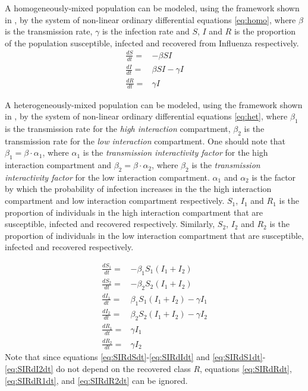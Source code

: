 \documentclass[a4paper, 12pt, journal]{ieeeconf}\usepackage[]{graphicx}\usepackage[]{color}
\begin{document}
A homogeneously-mixed population can be modeled, using the framework shown in , by the system of non-linear ordinary differential equations \eqref{eq:homo}, where $\beta$ is the transmission rate, $\gamma$ is the infection rate and $S$, $I$ and $R$ is the proportion of the population susceptible, infected and recovered from Influenza respectively. 
\begin{subequations}\label{eq:homo}
\begin{eqnarray}
\frac{dS}{dt} =& -\beta S I \label{eq:SIRdSdt}\\
\frac{dI}{dt} =& \beta S I - \gamma I \label{eq:SIRdIdt}\\
\frac{dR}{dt} =& \gamma I \label{eq:SIRdRdt}
\end{eqnarray}
\end{subequations}

A heterogeneously-mixed population can be modeled, using the framework shown in , by the system of non-linear ordinary differential equations \eqref{eq:het}, where $\beta_1$ is the transmission rate for the \emph{high interaction} compartment, $\beta_2$ is the transmission rate for the \emph{low interaction} compartment. One should note that $\beta_1 = \beta\cdot\alpha_1$, where $\alpha_1$ is the \textit{transmission interactivity factor} for the high interaction compartment and $\beta_2 = \beta\cdot\alpha_2$, where $\beta_2$ is the \textit{transmission interactivity factor} for the low interaction compartment. $\alpha_1$ and $\alpha_2$ is the factor by which the probability of infection increases in the the high interaction compartment and low interaction compartment respectively. $S_1$, $I_1$ and $R_1$ is the proportion of individuals in the high interaction compartment that are susceptible, infected and recovered respectively. Similarly, $S_2$, $I_2$ and $R_2$ is the proportion of individuals in the low interaction compartment that are susceptible, infected and recovered respectively.

\begin{subequations}\label{eq:het}
\begin{eqnarray}
\frac{dS_1}{dt} =& -\beta_1 S_1 (I_1 + I_2) \label{eq:SIRdS1dt}\\
\frac{dS_2}{dt} =& -\beta_2 S_2 (I_1 + I_2)\label{eq:SIRdS2dt}\\
\frac{dI_1}{dt} =& \beta_1 S_1 (I_1 + I_2) - \gamma I_1\label{eq:SIRdI1dt}\\
\frac{dI_2}{dt} =& \beta_2 S_2 (I_1 + I_2) - \gamma I_2 \label{eq:SIRdI2dt}\\
\frac{dR_1}{dt} =& \gamma I_1 \label{eq:SIR_het_dr} \label{eq:SIRdR1dt}\\
\frac{dR_2}{dt} =& \gamma I_2 \label{eq:SIRdR2dt}
\end{eqnarray}
\end{subequations}
Note that since equations \eqref{eq:SIRdSdt}-\eqref{eq:SIRdIdt} and \eqref{eq:SIRdS1dt}-\eqref{eq:SIRdI2dt} do not depend on the recovered class $R$, equations \eqref{eq:SIRdRdt}, \eqref{eq:SIRdR1dt}, and \eqref{eq:SIRdR2dt} can be ignored.
\end{document}
